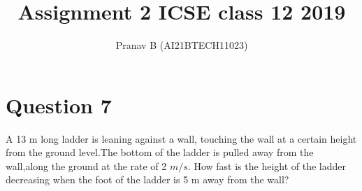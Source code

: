 \documentclass[journal,12pt,twocolumn]{IEEEtran}
\begin{document}
\makeatletter
{}
\makeatother
\let\StandardTheFigure\thefigure{}
\let\vec\mathbf{}
\renewcommand{\thefigure}{\theproblem}
\def\putbox#1#2#3{\makebox[0in][l]{\makebox[#1][l]{}\raisebox{\baselineskip}[0in][0in]{\raisebox{#2}[0in][0in]{#3}}}}
     \def\rightbox#1{\makebox[0in][r]{#1}}
     \def\centbox#1{\makebox[0in]{#1}}
     \def\topbox#1{\raisebox{-\baselineskip}[0in][0in]{#1}}
     \def\midbox#1{\raisebox{-0.5\baselineskip}[0in][0in]{#1}}
\vspace{3cm}
\title{Assignment 2 ICSE class 12 2019}
\author{Pranav B (AI21BTECH11023)}
\maketitle
\newpage
\bigskip
\renewcommand{\thefigure}{\theenumi}
\renewcommand{\thetable}{\theenumi}
\section*{Question 7 } 
	A 13 m long ladder is leaning against a wall, touching the wall at a certain height from the ground level.The bottom of the ladder is pulled away from the wall,along the ground at the rate of 2 $m/s$. How fast is the height of the ladder decreasing when the foot of the ladder is 5 m away from the wall?\\
\end{document}
